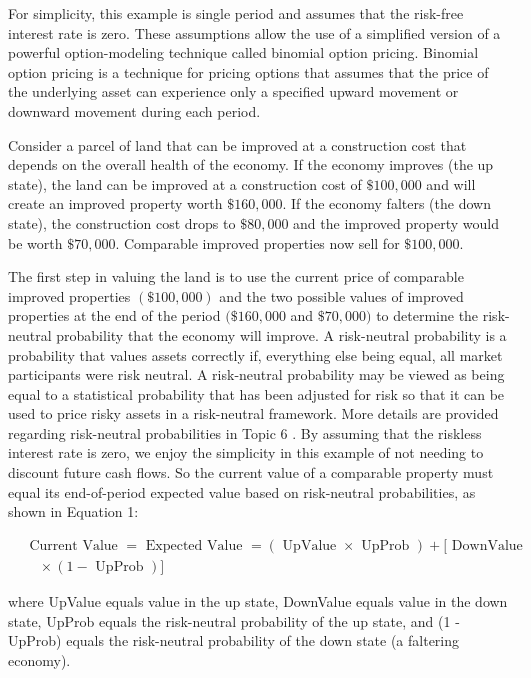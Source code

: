 \documentclass[11pt]{article}
\begin{document}
For simplicity, this example is single period and assumes that the risk-free interest rate is zero. These assumptions allow the use of a simplified version of a powerful option-modeling technique called binomial option pricing. Binomial option pricing is a technique for pricing options that assumes that the price of the underlying asset can experience only a specified upward movement or downward movement during each period.

Consider a parcel of land that can be improved at a construction cost that depends on the overall health of the economy. If the economy improves (the up state), the land can be improved at a construction cost of $\$ 100,000$ and will create an improved property worth $\$ 160,000$. If the economy falters (the down state), the construction cost drops to $\$ 80,000$ and the improved property would be worth $\$ 70,000$. Comparable improved properties now sell for $\$ 100,000$.

The first step in valuing the land is to use the current price of comparable improved properties $(\$ 100,000)$ and the two possible values of improved properties at the end of the period $(\$ 160,000$ and $\$ 70,000)$ to determine the risk-neutral probability that the economy will improve. A risk-neutral probability is a probability that values assets correctly if, everything else being equal, all market participants were risk neutral. A risk-neutral probability may be viewed as being equal to a statistical probability that has been adjusted for risk so that it can be used to price risky assets in a risk-neutral framework. More details are provided regarding risk-neutral probabilities in Topic 6 . By assuming that the riskless interest rate is zero, we enjoy the simplicity in this example of not needing to discount future cash flows. So the current value of a comparable property must equal its end-of-period expected value based on risk-neutral probabilities, as shown in Equation 1:


\begin{align*}
& \text { Current Value }=\text { Expected Value }=(\text { UpValue } \times \text { UpProb })+[\text { DownValue } \\
& \quad \times(1-\text { UpProb })] \tag{1}
\end{align*}


where UpValue equals value in the up state, DownValue equals value in the down state, UpProb equals the risk-neutral probability of the up state, and (1 - UpProb) equals the risk-neutral probability of the down state (a faltering economy).
\end{document}
